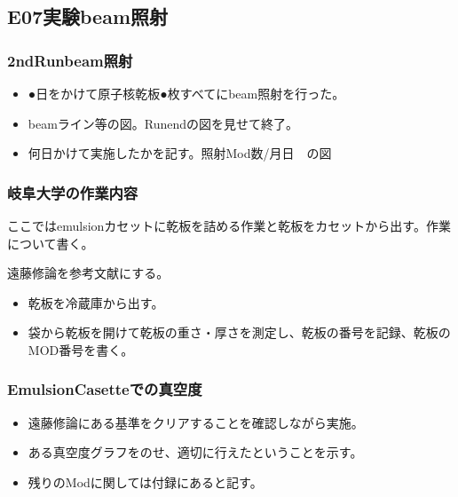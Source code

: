 \documentclass[12pt,a4paper]{jarticle}
\begin{document}
\subsection{E07実験beam照射}
\subsubsection{2ndRunbeam照射}
\begin{itemize}
 \item ●日をかけて原子核乾板●枚すべてにbeam照射を行った。
 \item beamライン等の図。Runendの図を見せて終了。
 \item 何日かけて実施したかを記す。照射Mod数/月日　の図
\end{itemize}
\subsubsection{岐阜大学の作業内容}
ここではemulsionカセットに乾板を詰める作業と乾板をカセットから出す。作業について書く。\par
遠藤修論を参考文献にする。
\begin{itemize}
 \item 乾板を冷蔵庫から出す。
 \item 袋から乾板を開けて乾板の重さ・厚さを測定し、乾板の番号を記録、乾板のMOD番号を書く。
\end{itemize}
\subsubsection{EmulsionCasetteでの真空度}
\begin{itemize}
 \item 遠藤修論にある基準をクリアすることを確認しながら実施。
 \item ある真空度グラフをのせ、適切に行えたということを示す。
 \item 残りのModに関しては付録にあると記す。
\end{itemize}
\end{document}
